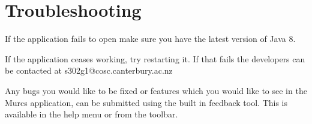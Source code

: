 \section{Troubleshooting}

If the application fails to open make sure you have the latest version of Java 8.

If the application ceases working, try restarting it. If that fails the developers can be contacted at s302g1@cosc.canterbury.ac.nz

Any bugs you would like to be fixed or features which you would like to see in the Murcs application, can be submitted using the built in feedback tool. This is available in the help menu or from the toolbar.